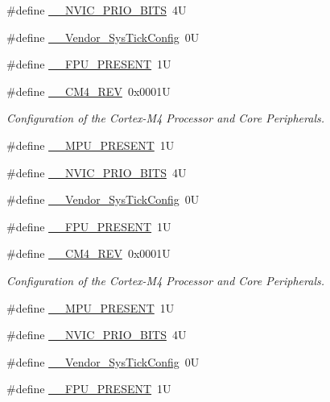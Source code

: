 \begin{DoxyCompactItemize}
\item 
\#define \hyperlink{group___configuration__section__for___c_m_s_i_s_gae3fe3587d5100c787e02102ce3944460}{\+\_\+\+\_\+\+N\+V\+I\+C\+\_\+\+P\+R\+I\+O\+\_\+\+B\+I\+TS}~4U
\item 
\#define \hyperlink{group___configuration__section__for___c_m_s_i_s_gab58771b4ec03f9bdddc84770f7c95c68}{\+\_\+\+\_\+\+Vendor\+\_\+\+Sys\+Tick\+Config}~0U
\item 
\#define \hyperlink{group___configuration__section__for___c_m_s_i_s_gac1ba8a48ca926bddc88be9bfd7d42641}{\+\_\+\+\_\+\+F\+P\+U\+\_\+\+P\+R\+E\+S\+E\+NT}~1U
\item 
\#define \hyperlink{group___configuration__section__for___c_m_s_i_s_ga45a97e4bb8b6ce7c334acc5f45ace3ba}{\+\_\+\+\_\+\+C\+M4\+\_\+\+R\+EV}~0x0001U
\begin{DoxyCompactList}\small\item\em Configuration of the Cortex-\/\+M4 Processor and Core Peripherals. \end{DoxyCompactList}\item 
\#define \hyperlink{group___configuration__section__for___c_m_s_i_s_ga4127d1b31aaf336fab3d7329d117f448}{\+\_\+\+\_\+\+M\+P\+U\+\_\+\+P\+R\+E\+S\+E\+NT}~1U
\item 
\#define \hyperlink{group___configuration__section__for___c_m_s_i_s_gae3fe3587d5100c787e02102ce3944460}{\+\_\+\+\_\+\+N\+V\+I\+C\+\_\+\+P\+R\+I\+O\+\_\+\+B\+I\+TS}~4U
\item 
\#define \hyperlink{group___configuration__section__for___c_m_s_i_s_gab58771b4ec03f9bdddc84770f7c95c68}{\+\_\+\+\_\+\+Vendor\+\_\+\+Sys\+Tick\+Config}~0U
\item 
\#define \hyperlink{group___configuration__section__for___c_m_s_i_s_gac1ba8a48ca926bddc88be9bfd7d42641}{\+\_\+\+\_\+\+F\+P\+U\+\_\+\+P\+R\+E\+S\+E\+NT}~1U
\item 
\#define \hyperlink{group___configuration__section__for___c_m_s_i_s_ga45a97e4bb8b6ce7c334acc5f45ace3ba}{\+\_\+\+\_\+\+C\+M4\+\_\+\+R\+EV}~0x0001U
\begin{DoxyCompactList}\small\item\em Configuration of the Cortex-\/\+M4 Processor and Core Peripherals. \end{DoxyCompactList}\item 
\#define \hyperlink{group___configuration__section__for___c_m_s_i_s_ga4127d1b31aaf336fab3d7329d117f448}{\+\_\+\+\_\+\+M\+P\+U\+\_\+\+P\+R\+E\+S\+E\+NT}~1U
\item 
\#define \hyperlink{group___configuration__section__for___c_m_s_i_s_gae3fe3587d5100c787e02102ce3944460}{\+\_\+\+\_\+\+N\+V\+I\+C\+\_\+\+P\+R\+I\+O\+\_\+\+B\+I\+TS}~4U
\item 
\#define \hyperlink{group___configuration__section__for___c_m_s_i_s_gab58771b4ec03f9bdddc84770f7c95c68}{\+\_\+\+\_\+\+Vendor\+\_\+\+Sys\+Tick\+Config}~0U
\item 
\#define \hyperlink{group___configuration__section__for___c_m_s_i_s_gac1ba8a48ca926bddc88be9bfd7d42641}{\+\_\+\+\_\+\+F\+P\+U\+\_\+\+P\+R\+E\+S\+E\+NT}~1U
\end{DoxyCompactItemize}


